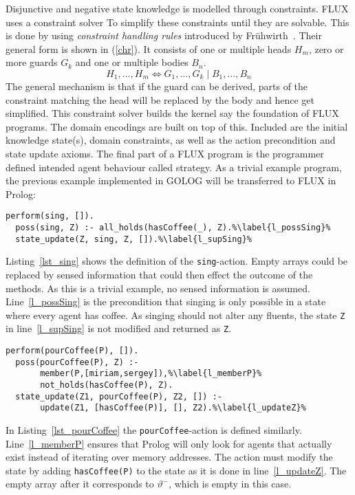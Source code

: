 Disjunctive and negative state knowledge is modelled through constraints. FLUX uses a constraint solver To simplify these constraints until they are solvable. This is done by using \emph{constraint handling rules} introduced by Frühwirth~\cite{fruhwirth_theory_1998}. Their general form is shown in (\ref{chr}). It consists of one or multiple heads $H_m$, zero or more guards $G_k$ and one or multiple bodies $B_n$.
\begin{equation}\label{chr}
  H_1,\ldots,H_m\Leftrightarrow G_1,\ldots,G_k \mid B_1,\ldots,B_n
\end{equation}
The general mechanism is that if the guard can be derived, parts of the constraint matching the head will be replaced by the body and hence get simplified. This constraint solver builds the kernel say the foundation of FLUX programs. The domain encodings are built on top of this. Included are the initial knowledge state(s), domain constraints, as well as the action precondition and state update axioms. The final part of a FLUX program is the programmer defined intended agent behaviour called strategy. As a trivial example program, the previous example implemented in GOLOG will be transferred to FLUX in Prolog:
\begin{lstlisting}[caption={Defintion of the \texttt{sing}-action.}, label=lst_sing]
  perform(sing, []).
  poss(sing, Z) :- all_holds(hasCoffee(_), Z).%\label{l_possSing}%
  state_update(Z, sing, Z, []).%\label{l_supSing}%
\end{lstlisting}
Listing~\ref{lst_sing} shows the definition of the \texttt{sing}-action. Empty arrays could be replaced by sensed information that could then effect the outcome of the methods. As this is a trivial example, no sensed information is assumed. Line~\ref{l_possSing} is the precondition that singing is only possible in a state where every agent has coffee. As singing should not alter any fluents, the state \texttt{Z} in line~\ref{l_supSing} is not modified and returned as \texttt{Z}.
\begin{lstlisting}[firstnumber=4, caption={Definition of the \texttt{pourCoffee}-action}, label=lst_pourCoffee]
  perform(pourCoffee(P), []).
  poss(pourCoffee(P), Z) :-
       member(P,[miriam,sergey]),%\label{l_memberP}%
       not_holds(hasCoffee(P), Z).
  state_update(Z1, pourCoffee(P), Z2, []) :-
       update(Z1, [hasCoffee(P)], [], Z2).%\label{l_updateZ}%
\end{lstlisting}
In Listing~\ref{lst_pourCoffee} the \texttt{pourCoffee}-action is defined similarly. Line~\ref{l_memberP} ensures that Prolog will only look for agents that actually exist instead of iterating over memory addresses. The action must modify the state by adding \texttt{hasCoffee(P)} to the state as it is done in line~\ref{l_updateZ}. The empty array after it corresponds to $\vartheta^-$, which is empty in this case.
